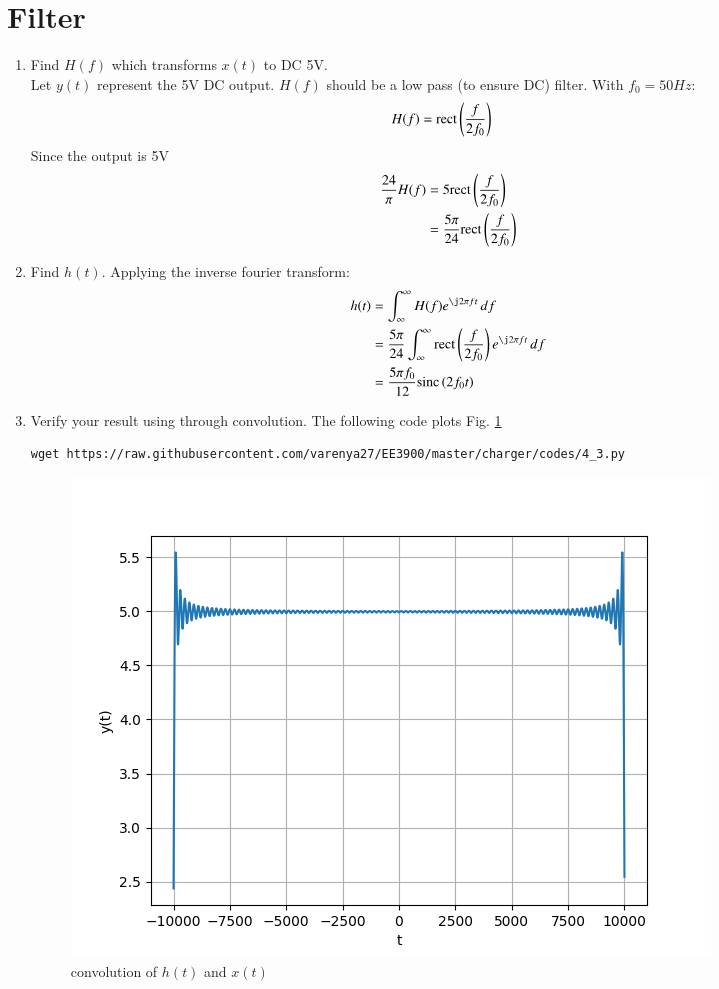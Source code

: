 \documentclass[journal,12pt,twocolumn]{IEEEtran}
\renewcommand\thesection{\arabic{section}}
\begin{document}
\section{Filter}
\begin{enumerate}[label=\thesection.\arabic*
,ref=\thesection.\theenumi]
\item Find $H(f)$ which transforms $x(t)$ to DC 5V.\\\solution Let $y(t)$ represent the 5V DC output. $H(f)$ should be a low pass (to ensure DC) filter. With $f_0 = 50Hz$:
\begin{align}
    H(f) &= \text{rect}\left(\frac{f}{2f_0}\right)
\end{align}
Since the output is 5V
\begin{align}
    \frac{24}{\pi}H(f) &= 5\text{rect}\left(\frac{f}{2f_0}\right)\\
    &= \frac{5\pi}{24}\text{rect}\left(\frac{f}{2f_0}\right)
\end{align}
\item Find $h(t)$.
Applying the inverse fourier transform:
\begin{align}
    h(t) &= \int_\infty^\infty H(f)e^{\j2\pi ft}\,df\\
    &= \frac{5\pi}{24}\int_\infty^\infty \rect{\frac{f}{2f_0}}e^{\j2\pi ft}\,df\\
    &= \frac{5\pi f_0}{12}\sinc{2f_0t}
\end{align}
\item Verify your result using  through convolution.
  The following code plots Fig. \ref{fig:conv-ft}
	\begin{lstlisting}
wget https://raw.githubusercontent.com/varenya27/EE3900/master/charger/codes/4_3.py
\end{lstlisting}
	\begin{figure}[h!]
	    \centering
	    \includegraphics[width=\columnwidth]{figures/conv-hx.png}
	    \caption{convolution of $h(t)$ and $x(t)$ }
	    \label{fig:conv-ft}
	\end{figure}

\end{enumerate}
\end{document}
